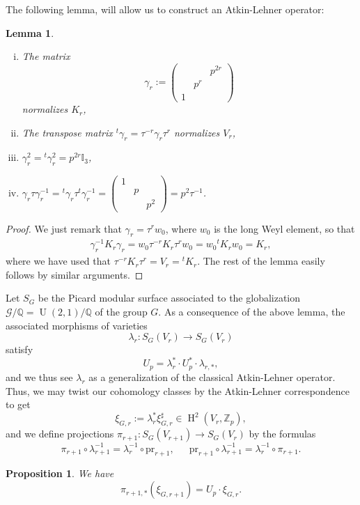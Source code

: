 \documentclass[12pt,a4paper,reqno]{amsart}
\theoremstyle{definition}
\numberwithin{definition}{subsection}
\theoremstyle{definition}
\numberwithin{Definition}{subsection}
\theoremstyle{remark}
\theoremstyle{remark}
\numberwithin{Remark}{subsection}
\theoremstyle{remark}
\theoremstyle{plain}
\numberwithin{Theorem}{subsection}
\theoremstyle{plain}
\theoremstyle{plain}
\theoremstyle{plain}
\theoremstyle{plain}
\newtheorem{Lemma}[Theorem]{Lemma}
\theoremstyle{plain}
\theoremstyle{plain}
\newtheorem{Proposition}[Theorem]{Proposition}
\theoremstyle{plain}
\newcommand*{\Z}{\mathbb{Z}}
\newcommand*{\Q}{\mathbb{Q}}
\DeclareMathOperator{\U}{U}
\DeclareMathOperator{\h}{H}
\begin{document}
The following lemma, will allow us to construct an Atkin-Lehner operator:
\begin{Lemma}
\begin{enumerate}[(i)]
\item The matrix \[
\gamma_r:=\begin{pmatrix}
 & & p^{2r}\\
 & p^{r}&\\
 1 & &  
\end{pmatrix}
\] normalizes $K_r$,
\item The transpose matrix ${^t}\gamma_r=\tau^{-r}\gamma_r\tau^{r}$ normalizes $V_r$,
\item $\gamma_r^2={^t}\gamma^{2}_r=p^{2r}\mathbb{I}_{3}$,
\item $\gamma_r\tau\gamma_r^{-1}={^t}\gamma_r\tau{^t}\gamma_r^{-1}=\begin{pmatrix}
1 & &\\
& p &\\
& &p^{2}
\end{pmatrix}=p^{2}\tau^{-1}$.
\end{enumerate}
\end{Lemma}

\begin{proof}
    We just remark that $\gamma_r=\tau^rw_0$, where $w_0$ is the long Weyl element, so that 
    \begin{align*}
        \gamma_r^{-1}K_r\gamma_r=w_0\tau^{-r}K_r\tau^rw_0=w_0 {^t} K_rw_0=K_r,
    \end{align*}
    where we have used that $\tau^{-r}K_r\tau^r=V_r= {^t}K_r$. The rest of the lemma easily follows by similar arguments. 
\end{proof}

\noindent Let $S_G$ be the Picard modular surface associated to the globalization $\mathcal{G}/\Q=\U(2,1)/\Q$ of the group $G$.
As a consequence of the above lemma, the associated morphisms of varieties
\[
\lambda_r: S_G(V_r)\to S_G(V_r)
\]
satisfy
\[
U_p=\lambda_r^*\cdot U_p^*\cdot \lambda_{r,*},
\]
and we thus see $\lambda_r$ as a generalization of the classical Atkin-Lehner operator.
Thus, we may twist our cohomology classes by the Atkin-Lehner correspondence to get 
\[
\xi_{G,r}:=\lambda_r^*\xi_{G,r}^\sharp\in \h^2_{}(V_r,\Z_p),
\]
and we define projections $\pi_{r+1}:S_{G}(V_{r+1})\to S_G(V_{r})$ by the formulas
\[
\pi_{r+1}\circ \lambda_{r+1}^{-1}=\lambda_r^{-1}\circ \text{pr}_{r+1},\,\,\,\,\,\,\,\,\, \text{pr}_{r+1}\circ \lambda_{r+1}^{-1}=\lambda_r^{-1}\circ \pi_{r+1}.
\]
\begin{Proposition}
\label{compatibility}
We have
\[
\pi_{r+1,*}(\xi_{G,r+1})=U_p\cdot  \xi_{G,r}.
\]
\end{Proposition}
\end{document}
